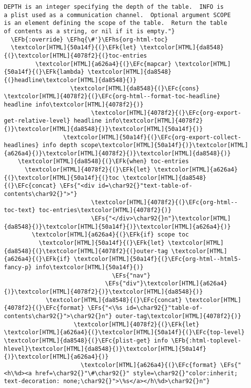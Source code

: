 \documentclass{scrartcl}
\newcommand{\EFk}[1]{\textcolor{EFk}{#1}} %
\newcommand{\EFs}[1]{\textcolor{EFs}{#1}} %
\newcommand{\EFb}[1]{\textcolor{EFb}{#1}} %
\newcommand{\EFc}[1]{\textcolor{EFc}{#1}} %
\newcommand{\EFhq}[1]{\textcolor{EFhq}{#1}} %
\newcommand{\EFhs}[1]{\textcolor{EFhs}{#1}} %
\begin{document}
\begin{Code}
\begin{Verbatim}[]
DEPTH is an integer specifying the depth of the table.  INFO is
a plist used as a communication channel.  Optional argument SCOPE
is an element defining the scope of the table.  Return the table
of contents as a string, or nil if it is empty."}
  \EFb{:override} \EFhq{\#'}\EFhs{org-html-toc}
  \textcolor[HTML]{50a14f}{(}\EFk{let} \textcolor[HTML]{da8548}{(}\textcolor[HTML]{4078f2}{(}toc-entries
         \textcolor[HTML]{a626a4}{(}\EFc{mapcar} \textcolor[HTML]{50a14f}{(}\EFk{lambda} \textcolor[HTML]{da8548}{(}headline\textcolor[HTML]{da8548}{)}
                   \textcolor[HTML]{da8548}{(}\EFc{cons} \textcolor[HTML]{4078f2}{(}\EFc{org-html--format-toc-headline} headline info\textcolor[HTML]{4078f2}{)}
                         \textcolor[HTML]{4078f2}{(}\EFc{org-export-get-relative-level} headline info\textcolor[HTML]{4078f2}{)}\textcolor[HTML]{da8548}{)}\textcolor[HTML]{50a14f}{)}
                 \textcolor[HTML]{50a14f}{(}\EFc{org-export-collect-headlines} info depth scope\textcolor[HTML]{50a14f}{)}\textcolor[HTML]{a626a4}{)}\textcolor[HTML]{4078f2}{)}\textcolor[HTML]{da8548}{)}
    \textcolor[HTML]{da8548}{(}\EFk{when} toc-entries
      \textcolor[HTML]{4078f2}{(}\EFk{let} \textcolor[HTML]{a626a4}{(}\textcolor[HTML]{50a14f}{(}toc \textcolor[HTML]{da8548}{(}\EFc{concat} \EFs{"<div id=\char92{}"text-table-of-contents\char92{}">"}
                         \textcolor[HTML]{4078f2}{(}\EFc{org-html--toc-text} toc-entries\textcolor[HTML]{4078f2}{)}
                         \EFs{"</div>\char92{}n"}\textcolor[HTML]{da8548}{)}\textcolor[HTML]{50a14f}{)}\textcolor[HTML]{a626a4}{)}
        \textcolor[HTML]{a626a4}{(}\EFk{if} scope toc
          \textcolor[HTML]{50a14f}{(}\EFk{let} \textcolor[HTML]{da8548}{(}\textcolor[HTML]{4078f2}{(}outer-tag \textcolor[HTML]{a626a4}{(}\EFk{if} \textcolor[HTML]{50a14f}{(}\EFc{org-html--html5-fancy-p} info\textcolor[HTML]{50a14f}{)}
                               \EFs{"nav"}
                             \EFs{"div"}\textcolor[HTML]{a626a4}{)}\textcolor[HTML]{4078f2}{)}\textcolor[HTML]{da8548}{)}
            \textcolor[HTML]{da8548}{(}\EFc{concat} \textcolor[HTML]{4078f2}{(}\EFc{format} \EFs{"<\%s id=\char92{}"table-of-contents\char92{}">\char92{}n"} outer-tag\textcolor[HTML]{4078f2}{)}
                    \textcolor[HTML]{4078f2}{(}\EFk{let} \textcolor[HTML]{a626a4}{(}\textcolor[HTML]{50a14f}{(}\EFc{top-level} \textcolor[HTML]{da8548}{(}\EFc{plist-get} info \EFb{:html-toplevel-hlevel}\textcolor[HTML]{da8548}{)}\textcolor[HTML]{50a14f}{)}\textcolor[HTML]{a626a4}{)}
                      \textcolor[HTML]{a626a4}{(}\EFc{format} \EFs{"<h\%d><a href=\char92{}"\#\char92{}" style=\char92{}"color:inherit; text-decoration: none;\char92{}">\%s</a></h\%d>\char92{}n"}

\end{Verbatim}
\end{Code}
\end{document}
